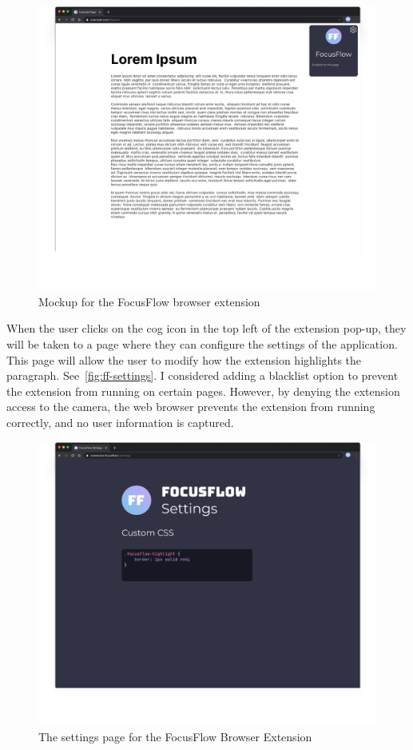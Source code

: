 \documentclass{report}
\begin{document}
\begin{figure}
    \begin{center}
        \includegraphics[scale=0.25]{../assets/user-interface-design.png}
    \end{center}
    \caption{Mockup for the FocusFlow browser extension}
    \label{fig:focusflow-mockup}
\end{figure}

When the user clicks on the cog icon in the top left of the extension pop-up, they will be taken to a page where they can configure the settings of the application. This page will allow the user to modify how the extension highlights the paragraph. See~\autoref{fig:ff-settings}. I considered adding a blacklist option to prevent the extension from running on certain pages. However, by denying the extension access to the camera, the web browser prevents the extension from running correctly, and no user information is captured. 

\begin{figure}
    \centering
    \includegraphics[scale=0.25]{../assets/focusflow-settings-page.png}
    \caption{The settings page for the FocusFlow Browser Extension}
    \label{fig:ff-settings}
\end{figure}
\end{document}
